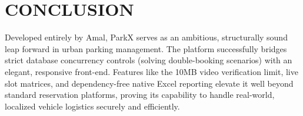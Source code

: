 \documentclass[12pt,a4paper]{report}
\begin{document}
\chapter{CONCLUSION}
Developed entirely by Amal, ParkX serves as an ambitious, structurally sound leap forward in urban parking management. The platform successfully bridges strict database concurrency controls (solving double-booking scenarios) with an elegant, responsive front-end. Features like the 10MB video verification limit, live slot matrices, and dependency-free native Excel reporting elevate it well beyond standard reservation platforms, proving its capability to handle real-world, localized vehicle logistics securely and efficiently.
\end{document}
